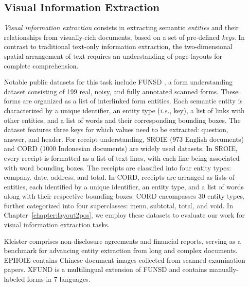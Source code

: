 \subsection{Visual Information Extraction}

  

\textit{Visual information extraction} consists in extracting semantic \textit{entities} and their relationships from visually-rich documents, based on a set of pre-defined \textit{keys}. In contrast to traditional text-only information extraction, the two-dimensional spatial arrangement of text requires an understanding of page layouts for complete comprehension. 

Notable public datasets for this task include \ac{FUNSD} \citep{jaume2019funsd}, a form understanding dataset consisting of 199 real, noisy, and fully annotated scanned forms. These forms are organized as a list of interlinked form entities. Each semantic entity is characterized by a unique identifier, an entity type (\textit{i.e.}, key), a list of links with other entities, and a list of words and their corresponding bounding boxes. The dataset features three keys for which values need to be extracted: question, answer, and header. For receipt understanding, \ac{SROIE} \citep{huang2019icdar2019} (973 English documents) and \ac{CORD} \citep{park2019cord} (1000 Indonesian documents) are widely used datasets. In \ac{SROIE}, every receipt is formatted as a list of text lines, with each line being associated with word bounding boxes. The receipts are classified into four entity types: company, date, address, and total. In \ac{CORD}, receipts are arranged as lists of entities, each identified by a unique identifier, an entity type, and a list of words along with their respective bounding boxes. \ac{CORD} encompasses 30 entity types, further categorized into four superclasses: menu, subtotal, total, and void. In Chapter~\ref{chapter:layout2pos}, we employ these datasets to evaluate our work for visual information extraction tasks.

Kleister \citep{gralinski2020kleister} comprises non-disclosure agreements and financial reports, serving as a benchmark for advancing entity extraction from long and complex documents. EPHOIE \citep{wang2021towards} contains Chinese document images collected from scanned examination papers. XFUND is a multilingual extension of \ac{FUNSD} \citep{xu-etal-2022-xfund} and contains manually-labeled forms in 7 languages.

